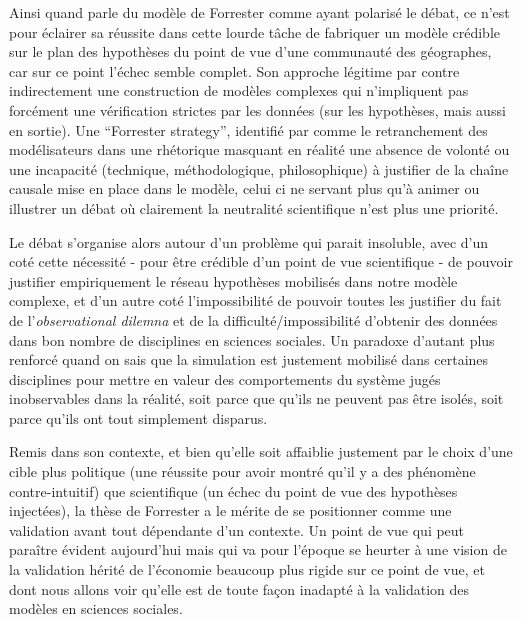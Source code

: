 Ainsi quand \autocite{Batty2001} parle du modèle de Forrester comme ayant polarisé le débat, ce n'est pour éclairer sa réussite dans cette lourde tâche de fabriquer un modèle crédible sur le plan des hypothèses du point de vue d'une communauté des géographes, car sur ce point l'échec semble complet. Son approche légitime par contre indirectement une construction de modèles complexes qui n'impliquent pas forcément une vérification strictes par les données (sur les hypothèses, mais aussi en sortie). Une \foreignquote{english}{Forrester strategy}, identifié par \textcite[7-8]{Batty2001} comme le retranchement des modélisateurs dans une rhétorique masquant en réalité une absence de volonté ou une incapacité (technique, méthodologique, philosophique) à justifier de la chaîne causale mise en place dans le modèle, celui ci ne servant plus qu'à animer ou illustrer un débat où clairement la neutralité scientifique n'est plus une priorité.

Le débat s'organise alors autour d'un problème qui parait insoluble, avec d'un coté cette nécessité - pour être crédible d'un point de vue scientifique - de pouvoir justifier empiriquement le réseau hypothèses mobilisés dans notre modèle complexe, et d'un autre coté l'impossibilité de pouvoir toutes les justifier du fait de l'\textit{observational dilemna} et de la difficulté/impossibilité d'obtenir des données dans bon nombre de disciplines en sciences sociales. Un paradoxe d'autant plus renforcé quand on sais que la simulation est justement mobilisé dans certaines disciplines pour mettre en valeur des comportements du système jugés inobservables dans la réalité, soit parce que qu'ils ne peuvent pas être isolés, soit parce qu'ils ont tout simplement disparus.

Remis dans son contexte, et bien qu'elle soit affaiblie justement par le choix d'une cible plus politique (une réussite pour avoir montré qu'il y a des phénomène contre-intuitif) que scientifique (un échec du point de vue des hypothèses injectées), la thèse de Forrester a le mérite de se positionner comme une validation avant tout dépendante d'un contexte. Un point de vue qui peut paraître évident aujourd'hui mais qui va pour l'époque se heurter à une vision de la validation hérité de l'économie beaucoup plus rigide sur ce point de vue, et dont nous allons voir qu'elle est de toute façon inadapté à la validation des modèles en sciences sociales.


